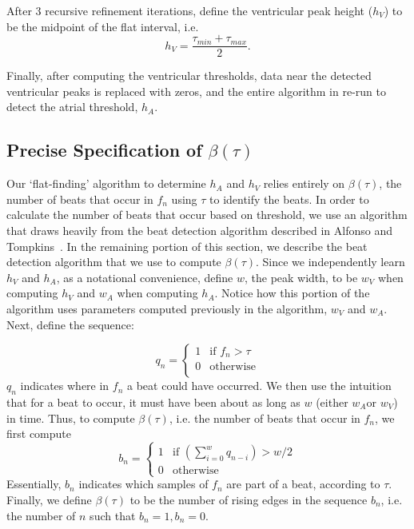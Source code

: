 \documentclass[conference]{IEEEtran}
\newcommand{\APW}{\ensuremath{w_A}}
\newcommand{\VPW}{\ensuremath{w_V}}
\newcommand{\APH}{\ensuremath{h_A}}
\newcommand{\VPH}{\ensuremath{h_V}}
\begin{document}
After 3 recursive refinement iterations, define the ventricular peak height (\VPH{}) to be the midpoint of the flat interval, i.e.
\begin{equation*}
	\VPH{}=\frac{\tau_{min}+\tau_{max}}{2}.
\end{equation*}

Finally, after computing the ventricular thresholds,
data near the detected ventricular peaks is replaced with
zeros, and the entire algorithm in re-run to detect the
atrial threshold, \APH{}.

\subsection{Precise Specification of $\beta(\tau)$}
Our `flat-finding' algorithm to determine \APH{} and
\VPH{} relies entirely on $\beta(\tau)$, 
the number of beats that occur in $f_n$ using
$\tau$ to identify the beats. In order to calculate the
number of beats that occur based on threshold, we use
an algorithm that draws heavily from the beat
detection algorithm described in Alfonso and Tompkins~\cite{realtime-qrs}.
In the remaining portion of this section, we describe
the beat detection algorithm that we use to compute
$\beta(\tau)$.
Since we independently learn \VPH{} and \APH{}, as a notational convenience, define $w$, the peak width, to be \VPW{} when computing \VPH{} and \APW{} when computing \APH{}.
Notice how this portion of the algorithm uses parameters computed previously in the algorithm, \VPW{} and \APW{}.
Next, define the sequence:

\begin{equation*}
	q_n=\left\{ 
		\begin{array}{lr}
			1 & \text{if } f_n > \tau \\
			0 & \text{otherwise}\\
		\end{array}
		\right.
\end{equation*}
$q_n$ indicates where in $f_n$ a beat could
have occurred. We then use the intuition that for a beat
to occur, it must have been about as long as $w$ (either \APW or \VPW) in time.
Thus, to compute $\beta(\tau)$, i.e. the number of
beats that occur in $f_n$, we first compute
\begin{equation*}
	b_n=\left\{ 
		\begin{array}{lc}
			1 & \text{if } \left(\sum_{i=0}^{w} q_{n-i} \right) > w/2 \\
			0 & \text{otherwise}
		\end{array}
		\right.
\end{equation*}
Essentially, $b_n$ indicates which samples of $f_n$ are part of a beat, according to $\tau$.
Finally, we define $\beta(\tau)$ to be the number of rising edges in the sequence $b_n$, 
i.e. the number of $n$ such that $b_n = 1, b_n = 0$. %
\end{document}
